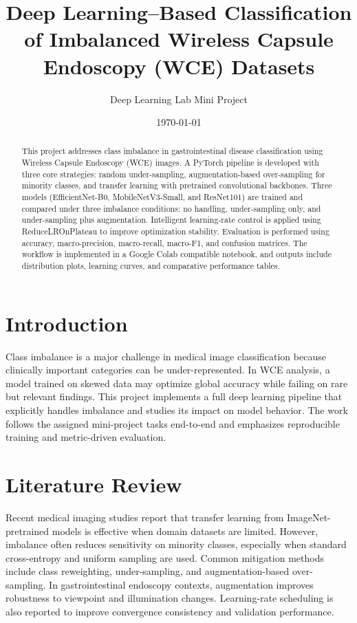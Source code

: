 \documentclass[12pt,a4paper]{article}
\title{Deep Learning--Based Classification of Imbalanced Wireless Capsule Endoscopy (WCE) Datasets}
\author{Deep Learning Lab Mini Project}
\date{\today}
\begin{document}
\maketitle

\begin{abstract}
This project addresses class imbalance in gastrointestinal disease classification using Wireless Capsule Endoscopy (WCE) images. A PyTorch pipeline is developed with three core strategies: random under-sampling, augmentation-based over-sampling for minority classes, and transfer learning with pretrained convolutional backbones. Three models (EfficientNet-B0, MobileNetV3-Small, and ResNet101) are trained and compared under three imbalance conditions: no handling, under-sampling only, and under-sampling plus augmentation. Intelligent learning-rate control is applied using ReduceLROnPlateau to improve optimization stability. Evaluation is performed using accuracy, macro-precision, macro-recall, macro-F1, and confusion matrices. The workflow is implemented in a Google Colab compatible notebook, and outputs include distribution plots, learning curves, and comparative performance tables.
\end{abstract}

\section{Introduction}
Class imbalance is a major challenge in medical image classification because clinically important categories can be under-represented. In WCE analysis, a model trained on skewed data may optimize global accuracy while failing on rare but relevant findings. This project implements a full deep learning pipeline that explicitly handles imbalance and studies its impact on model behavior. The work follows the assigned mini-project tasks end-to-end and emphasizes reproducible training and metric-driven evaluation.

\section{Literature Review}
Recent medical imaging studies report that transfer learning from ImageNet-pretrained models is effective when domain datasets are limited. However, imbalance often reduces sensitivity on minority classes, especially when standard cross-entropy and uniform sampling are used. Common mitigation methods include class reweighting, under-sampling, and augmentation-based over-sampling. In gastrointestinal endoscopy contexts, augmentation improves robustness to viewpoint and illumination changes. Learning-rate scheduling is also reported to improve convergence consistency and validation performance.
\end{document}
